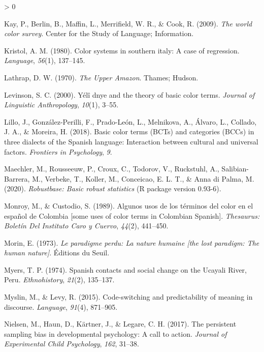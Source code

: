 \documentclass[
  english,
  ,apa7,floatsintext]{apa6}
\newlength{\cslhangindent}
\newenvironment{CSLReferences}[2] %
 {%
  \setlength{\parindent}{0pt}
  \ifodd #1 \everypar{\setlength{\hangindent}{\cslhangindent}}\ignorespaces\fi
  \ifnum #2 > 0
  \setlength{\parskip}{#2\baselineskip}
  \fi
 }%
 {}
\begin{document}
\begin{CSLReferences}{1}{0}
\leavevmode\hypertarget{ref-berlin2009}{}%
Kay, P., Berlin, B., Maffin, L., Merrifield, W. R., \& Cook, R. (2009). \emph{The world color survey}. Center for the Study of Language; Information.

\leavevmode\hypertarget{ref-kristol1980}{}%
Kristol, A. M. (1980). Color systems in southern italy: A case of regression. \emph{Language}, \emph{56}(1), 137--145.

\leavevmode\hypertarget{ref-lathrap1970}{}%
Lathrap, D. W. (1970). \emph{The {U}pper {A}mazon}. Thames; Hudson.

\leavevmode\hypertarget{ref-levinson2000}{}%
Levinson, S. C. (2000). Yélî dnye and the theory of basic color terms. \emph{Journal of Linguistic Anthropology}, \emph{10}(1), 3--55.

\leavevmode\hypertarget{ref-lillo2018}{}%
Lillo, J., González-Perilli, F., Prado-León, L., Melnikova, A., Álvaro, L., Collado, J. A., \& Moreira, H. (2018). Basic color terms (BCTs) and categories (BCCs) in three dialects of the {S}panish language: Interaction between cultural and universal factors. \emph{Frontiers in Psychology}, \emph{9}.

\leavevmode\hypertarget{ref-R-robustbase}{}%
Maechler, M., Rousseeuw, P., Croux, C., Todorov, V., Ruckstuhl, A., Salibian-Barrera, M., Verbeke, T., Koller, M., Conceicao, E. L. T., \& Anna di Palma, M. (2020). \emph{Robustbase: Basic robust statistics} (R package version 0.93-6).

\leavevmode\hypertarget{ref-monroy1989}{}%
Monroy, M., \& Custodio, S. (1989). Algunos usos de los t{é}rminos del color en el espa{ñ}ol de {C}olombia {[}some uses of color terms in {C}olombian {S}panish{]}. \emph{Thesaurus: Bolet{í}n Del Instituto Caro y Cuervo}, \emph{44}(2), 441--450.

\leavevmode\hypertarget{ref-morin1973}{}%
Morin, E. (1973). \emph{Le paradigme perdu: La nature humaine {[}the lost paradigm: The human nature{]}}. {É}ditions du Seuil.

\leavevmode\hypertarget{ref-Myers1974}{}%
Myers, T. P. (1974). {S}panish contacts and social change on the {U}cayali {R}iver, {P}eru. \emph{Ethnohistory}, \emph{21}(2), 135--137.

\leavevmode\hypertarget{ref-myslin2015}{}%
Myslin, M., \& Levy, R. (2015). Code-switching and predictability of meaning in discourse. \emph{Language}, \emph{91}(4), 871--905.

\leavevmode\hypertarget{ref-nielson2017}{}%
Nielsen, M., Haun, D., Kärtner, J., \& Legare, C. H. (2017). The persistent sampling bias in developmental psychology: A call to action. \emph{Journal of Experimental Child Psychology}, \emph{162}, 31--38.


\end{CSLReferences}
\end{document}
